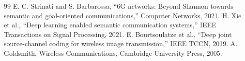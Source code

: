 \documentclass[sigconf]{acmart}
\begin{document}
\begin{thebibliography}{99}
 E. C. Strinati and S. Barbarossa, ``6G networks: Beyond Shannon towards semantic and goal-oriented communications,'' Computer Networks, 2021.
 H. Xie et al., ``Deep learning enabled semantic communication systems,'' IEEE Transactions on Signal Processing, 2021.
 E. Bourtsoulatze et al., ``Deep joint source-channel coding for wireless image transmission,'' IEEE TCCN, 2019.
 A. Goldsmith, Wireless Communications, Cambridge University Press, 2005.
\end{thebibliography}
\end{document}
